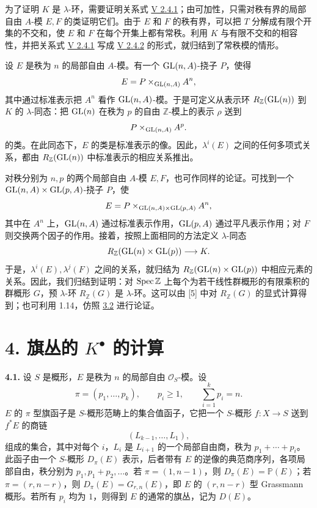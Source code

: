为了证明 \(K\) 是 \(\lambda\)-环，需要证明关系式 \hyperlink{sga6.e05.eq.2-4-1}{V 2.4.1}；由可加性，只需对秩有界的局部自由 \(A\)-模 \(E,F\) 的类证明它们。由于 \(E\) 和 \(F\) 的秩有界，可以把 \(T\) 分解成有限个开集的不交和，使 \(E\) 和 \(F\) 在每个开集上都有常秩。利用 \(K\) 与有限不交和的相容性，并把关系式 \hyperlink{sga6.e05.eq.2-4-1}{V 2.4.1} 写成 \hyperlink{sga6.e05.eq.2-4-2}{V 2.4.2} 的形式，就归结到了常秩模的情形。

设 \(E\) 是秩为 \(n\) 的局部自由 \(A\)-模。有一个 \(\operatorname{GL}(n,A)\)-挠子 \(P\)，使得
\[
  E=P\times_{\operatorname{GL}(n,A)} A^n,
\]
其中通过标准表示把 \(A^n\) 看作 \(\operatorname{GL}(n,A)\)-模。于是可定义从表示环 \(R_{\mathbb Z}(\operatorname{GL}(n))\) 到 \(K\) 的 \(\lambda\)-同态：把 \(\operatorname{GL}(n)\) 在秩为 \(p\) 的自由 \(\mathbb Z\)-模上的表示 \(\rho\) 送到
\[
  P\times_{\operatorname{GL}(n,A)} A^p.
\]
的类。在此同态下，\(E\) 的类是标准表示的像。因此，\(\lambda^i(E)\) 之间的任何多项式关系，都由 \(R_{\mathbb Z}(\operatorname{GL}(n))\) 中标准表示的相应关系推出。

对秩分别为 \(n,p\) 的两个局部自由 \(A\)-模 \(E,F\)，也可作同样的论证。可找到一个 \(\operatorname{GL}(n,A)\times\operatorname{GL}(p,A)\)-挠子 \(P\)，使
\[
 E=P\times_{\operatorname{GL}(n,A)\times\operatorname{GL}(p,A)}A^n,
\]
其中在 \(A^n\) 上，\(\operatorname{GL}(n,A)\) 通过标准表示作用，\(\operatorname{GL}(p,A)\) 通过平凡表示作用；对 \(F\) 则交换两个因子的作用。接着，按照上面相同的方法定义 \(\lambda\)-同态
\[
 R_{\mathbb Z}(\operatorname{GL}(n)\times\operatorname{GL}(p))\longrightarrow K.
\]
于是，\(\lambda^i(E),\lambda^j(F)\) 之间的关系，就归结为 \(R_{\mathbb Z}(\operatorname{GL}(n)\times\operatorname{GL}(p))\) 中相应元素的关系。因此，我们归结到证明：对 \(\operatorname{Spec}\mathbb Z\) 上每个为若干线性群概形的有限乘积的群概形 \(G\)，预 \(\lambda\)-环 \(R_{\mathbb Z}(G)\) 是 \(\lambda\)-环。这可以由 [5] 中对 \(R_{\mathbb Z}(G)\) 的显式计算得到；也可利用 1.14，仿照 \hyperlink{sga6.e06.thm.3-2}{3.2} 进行论证。

\section*{4. 旗丛的 \(K^\bullet\) 的计算}

\noindent\textbf{4.1.}
设 \(S\) 是概形，\(E\) 是秩为 \(n\) 的局部自由 \(\mathcal O_S\)-模。设
\[
  \pi=(p_1,\ldots,p_k),\qquad p_i\geq 1,
  \qquad \sum_{i=1}^k p_i=n.
\]
\(E\) 的 \(\pi\) 型旗函子是 \(S\)-概形范畴上的集合值函子，它把一个 \(S\)-概形 \(f:X\to S\) 送到 \(f^*E\) 的商链
\[
  (L_{k-1},\ldots,L_1),
\]
组成的集合，其中对每个 \(i\)，\(L_i\) 是 \(L_{i+1}\) 的一个局部自由商，秩为 \(p_1+\cdots+p_i\)。此函子由一个 \(S\)-概形 \(D_\pi(E)\) 表示，后者带有 \(E\) 的逆像的典范商序列，各项局部自由，秩分别为 \(p_1,p_1+p_2,\ldots\)。若 \(\pi=(1,n-1)\)，则 \(D_\pi(E)=\mathbb P(E)\)；若 \(\pi=(r,n-r)\)，则 \(D_\pi(E)=G_{r,n}(E)\)，即 \(E\) 的 \((r,n-r)\) 型 Grassmann 概形。若所有 \(p_i\) 均为 \(1\)，则得到 \(E\) 的通常的旗丛，记为 \(D(E)\)。

